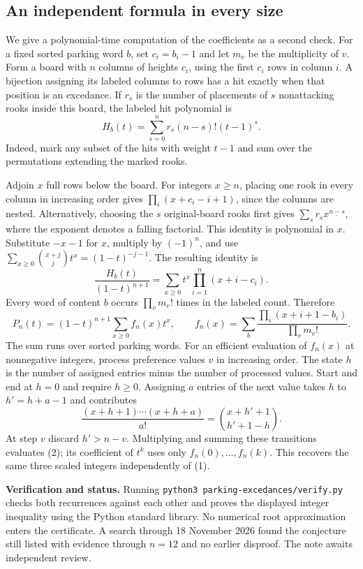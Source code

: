 \documentclass[11pt]{article}
\begin{document}
\subsection*{An independent formula in every size}
We give a polynomial-time computation of the coefficients as a second check. For a fixed sorted parking word $b$, set $c_i=b_i-1$ and let $m_v$ be the multiplicity of $v$. Form a board with $n$ columns of heights $c_i$, using the first $c_i$ rows in column $i$. A bijection assigning its labeled columns to rows has a hit exactly when that position is an excedance. If $r_s$ is the number of placements of $s$ nonattacking rooks inside this board, the labeled hit polynomial is
\[
 H_b(t)=\sum_{s=0}^n r_s(n-s)!(t-1)^s .
\]
Indeed, mark any subset of the hits with weight $t-1$ and sum over the permutations extending the marked rooks.

Adjoin $x$ full rows below the board. For integers $x\ge n$, placing one rook in every column in increasing order gives $\prod_i(x+c_i-i+1)$, since the columns are nested. Alternatively, choosing the $s$ original-board rooks first gives $\sum_s r_s x^{\underline{n-s}}$, where the exponent denotes a falling factorial. This identity is polynomial in $x$. Substitute $-x-1$ for $x$, multiply by $(-1)^n$, and use $\sum_{x\ge0}\binom{x+j}{j}t^x=(1-t)^{-j-1}$. The resulting identity is
\[
 \frac{H_b(t)}{(1-t)^{n+1}}=\sum_{x\ge0}t^x\prod_{i=1}^n(x+i-c_i).
\]
Every word of content $b$ occurs $\prod_v m_v!$ times in the labeled count. Therefore
\[
 P_n(t)=(1-t)^{n+1}\sum_{x\ge0}f_n(x)t^x,\qquad
 f_n(x)=\sum_{b}\frac{\prod_i(x+i+1-b_i)}{\prod_v m_v!}.
 \tag{2}
\]
The sum runs over sorted parking words. For an efficient evaluation of $f_n(x)$ at nonnegative integers, process preference values $v$ in increasing order. The state $h$ is the number of assigned entries minus the number of processed values. Start and end at $h=0$ and require $h\ge0$. Assigning $a$ entries of the next value takes $h$ to $h'=h+a-1$ and contributes
\[
 \frac{(x+h+1)\cdots(x+h+a)}{a!}=\binom{x+h'+1}{h'+1-h}.
\]
At step $v$ discard $h'>n-v$. Multiplying and summing these transitions evaluates (2); its coefficient of $t^k$ uses only $f_n(0),\ldots,f_n(k)$. This recovers the same three scaled integers independently of (1).

\small
\textbf{Verification and status.} Running \texttt{python3 parking-excedances/verify.py} checks both recurrences against each other and proves the displayed integer inequality using the Python standard library. No numerical root approximation enters the certificate. A search through 18 November 2026 found the conjecture still listed with evidence through $n=12$ and no earlier disproof. The note awaits independent review.
\end{document}
